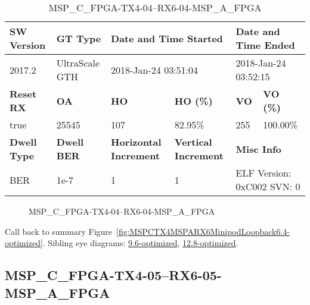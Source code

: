 \begin{table}[h]
\centering
\caption{MSP\_C\_FPGA-TX4-04--RX6-04-MSP\_A\_FPGA}
\label{tab:MSPCFPGATX404RX604MSPAFPGA6.4-optimized}
\begin{tabular}{@{}|l|l|l|l|l|l|@{}}
\toprule
\textbf{SW Version}                & \textbf{GT Type}   & \multicolumn{2}{l|}{\textbf{Date and Time Started}}            & \multicolumn{2}{l|}{\textbf{Date and Time Ended}}        \\ \midrule
2017.2                       & UltraScale GTH          & \multicolumn{2}{l|}{2018-Jan-24 03:51:04}                   & \multicolumn{2}{l|}{2018-Jan-24 03:52:15}               \\ \midrule
\textbf{Reset RX}                  & \textbf{OA} & \textbf{HO}   & \textbf{HO (\%)} & \textbf{VO} & \textbf{VO (\%)} \\ \midrule
true & 25545        & 107          & 82.95\%        & 255        & 100.00\%       \\ \midrule
\textbf{Dwell Type}                & \textbf{Dwell BER} & \textbf{Horizontal Increment} & \textbf{Vertical Increment}    & \multicolumn{2}{l|}{\textbf{Misc Info}}                  \\ \midrule
BER                            & 1e-7        & 1        & 1           & \multicolumn{2}{l|}{ELF Version: 0xC002 SVN: 0}                         \\ \bottomrule
\end{tabular}
\end{table}

\begin{figure}[h]
\caption{MSP\_C\_FPGA-TX4-04--RX6-04-MSP\_A\_FPGA} \label{fig:MSPCFPGATX404RX604MSPAFPGA6.4-optimized}
\end{figure}

Call back to summary Figure~\ref{fig:MSPCTX4MSPARX6MinipodLoopback6.4-optimized}.
Sibling eye diagrams: \hyperref[sec:MSPCFPGATX404RX604MSPAFPGA9.6-optimized]{9.6-optimized}, \hyperref[sec:MSPCFPGATX404RX604MSPAFPGA12.8-optimized]{12.8-optimized}.

\clearpage
\newpage


\subsection{MSP\_C\_FPGA-TX4-05--RX6-05-MSP\_A\_FPGA}\label{sec:MSPCFPGATX405RX605MSPAFPGA6.4-optimized}

